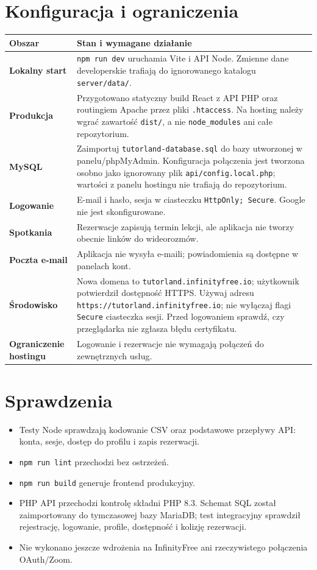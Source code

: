 \documentclass[10pt,a4paper]{article}
\begin{document}
\section{Konfiguracja i ograniczenia}
\small
\begin{tabularx}{\textwidth}{>{\bfseries}p{35mm}Y}
\toprule
Obszar & Stan i wymagane działanie\\
\midrule
Lokalny start & \texttt{npm run dev} uruchamia Vite i API Node. Zmienne dane developerskie trafiają do ignorowanego katalogu \texttt{server/data/}.\\
Produkcja & Przygotowano statyczny build React z API PHP oraz routingiem Apache przez pliki \texttt{.htaccess}. Na hosting należy wgrać zawartość \texttt{dist/}, a nie \texttt{node\_modules} ani całe repozytorium.\\
MySQL & Zaimportuj \texttt{tutorland-database.sql} do bazy utworzonej w panelu/phpMyAdmin. Konfiguracja połączenia jest tworzona osobno jako ignorowany plik \texttt{api/config.local.php}; wartości z panelu hostingu nie trafiają do repozytorium.\\
Logowanie & E-mail i hasło, sesja w ciasteczku \texttt{HttpOnly; Secure}. Google nie jest skonfigurowane.\\
Spotkania & Rezerwacje zapisują termin lekcji, ale aplikacja nie tworzy obecnie linków do wideorozmów.\\
Poczta e-mail & Aplikacja nie wysyła e-maili; powiadomienia są dostępne w panelach kont.\\
Środowisko & Nowa domena to \texttt{tutorland.infinityfree.io}; użytkownik potwierdził dostępność HTTPS. Używaj adresu \texttt{https://tutorland.infinityfree.io}; nie wyłączaj flagi \texttt{Secure} ciasteczka sesji. Przed logowaniem sprawdź, czy przeglądarka nie zgłasza błędu certyfikatu.\\
Ograniczenie hostingu & Logowanie i rezerwacje nie wymagają połączeń do zewnętrznych usług.\\
\bottomrule
\end{tabularx}
\normalsize

\section{Sprawdzenia}
\begin{itemize}
\item Testy Node sprawdzają kodowanie CSV oraz podstawowe przepływy API: konta, sesje, dostęp do profilu i zapis rezerwacji.
\item \texttt{npm run lint} przechodzi bez ostrzeżeń.
\item \texttt{npm run build} generuje frontend produkcyjny.
\item PHP API przechodzi kontrolę składni PHP 8.3. Schemat SQL został zaimportowany do tymczasowej bazy MariaDB; test integracyjny sprawdził rejestrację, logowanie, profile, dostępność i kolizję rezerwacji.
\item Nie wykonano jeszcze wdrożenia na InfinityFree ani rzeczywistego połączenia OAuth/Zoom.
\end{itemize}
\end{document}
